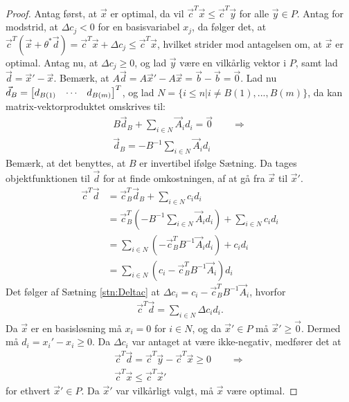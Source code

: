 \begin{proof}
Antag først, at $\vec{x}$ er optimal, da vil $\vec{c}^T\vec{x} \leq \vec{c}^T\vec{y}$ for alle $\vec{y} \in P$. 
Antag for modstrid, at $\Delta c_j < 0$ for en basisvariabel $x_j$, da følger det, at $\vec{c}^T(\vec{x}+\theta^*\vec{d}) = \vec{c}^T\vec{x} + \Delta c_j \leq \vec{c}^T\vec{x}$, hvilket strider mod antagelsen om, at $\vec{x}$ er optimal.
Antag nu, at $\Delta c_j \geq 0$, og lad $\vec{y}$ være en vilkårlig vektor i $P$, samt lad $\vec{d}=\vec{x}'-\vec{x}$.
Bemærk, at $A\vec{d} = A\vec{x}'- A\vec{x} =  \vec{b} - \vec{b} =\vec{0}$.
Lad nu $\vec{d}_B = \begin{bmatrix} d_{B(1)} & \cdots & d_{B(m)} \end{bmatrix}^T$, og lad $N= \{i \leq n| i \neq B(1),...,B(m)\}$, da kan matrix-vektorproduktet omskrives til:
\begin{align*}
	B\vec{d}_B + \sum_{i \in N} \vec{A}_i d_i = \vec{0} \qquad \Rightarrow
	\\ \vec{d}_B = - B^{-1}\sum_{i \in N} \vec{A}_i d_i
\end{align*}
Bemærk, at det benyttes, at $B$ er invertibel ifølge Sætning. %
Da tages objektfunktionen til $\vec{d}$ for at finde omkostningen, af at gå fra $\vec{x}$ til $\vec{x}'$.
\begin{align*}
 \vec{c}^T\vec{d} &= \vec{c}_B^T\vec{d}_B + \sum_{i \in N} c_i d_i 
 \\&= \vec{c}_B^T(- B^{-1}\sum_{i \in N} \vec{A}_i d_i) + \sum_{i \in N} c_i d_i  
 \\&= \sum_{i \in N} (- \vec{c}_B^T B^{-1} \vec{A}_i d_i) +  c_i d_i 
 \\&= \sum_{i \in N} ( c_i - \vec{c}_B^TB^{-1}\vec{A}_i ) d_i
\end{align*}
Det følger af Sætning \ref{stn:Deltac} at $\Delta c_i = c_i - \vec{c}_B^TB^{-1}\vec{A}_i $, hvorfor
\begin{align*}
\vec{c}^T\vec{d} = \sum_{i \in N} \Delta c_i d_i.
\end{align*}
Da $\vec{x}$ er en basisløsning må $x_i = 0$ for $i \in N$, og da $\vec{x}' \in P$ må $\vec{x}' \geq \vec{0}$. Dermed må $d_i = x_i' - x_i \geq 0$. Da $\Delta c_i$ var antaget at være ikke-negativ, medfører det at
\begin{align*}
\vec{c}^T\vec{d} = \vec{c}^T\vec{y}-\vec{c}^T\vec{x} \geq 0 \qquad \Rightarrow
\\ \vec{c}^T\vec{x} \leq \vec{c}^T\vec{x}'
\end{align*}
for ethvert $\vec{x}' \in P$. Da $\vec{x}'$ var vilkårligt valgt, må $\vec{x}$ være optimal.
\end{proof}

